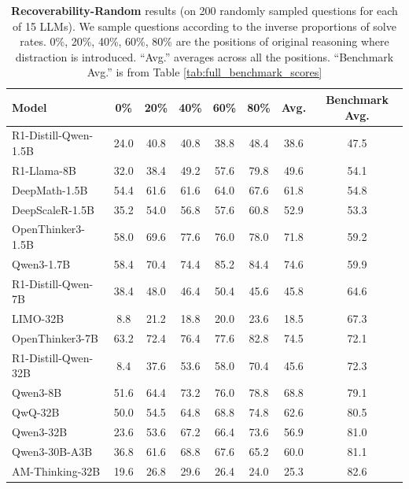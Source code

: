 \documentclass{article} %
\begin{document}
\begin{table}[ht!]
  \centering
  \begin{tabular}{lcccccc|c}
    \toprule
    \textbf{Model} & \textbf{0\%} & \textbf{20\%} & \textbf{40\%} & \textbf{60\%} & \textbf{80\%} & \textbf{Avg.} & \textbf{Benchmark Avg.} \\
    \midrule
    R1-Distill-Qwen-1.5B    & 24.0 & 40.8 & 40.8 & 38.8 & 48.4 & 38.6 & 47.5 \\
    R1-Llama-8B             & 32.0 & 38.4 & 49.2 & 57.6 & 79.8 & 49.6 & 54.1 \\
    DeepMath-1.5B           & 54.4 & 61.6 & 61.6 & 64.0 & 67.6 & 61.8 & 54.8 \\
    DeepScaleR-1.5B         & 35.2 & 54.0 & 56.8 & 57.6 & 60.8 & 52.9 & 53.3 \\
    OpenThinker3-1.5B       & 58.0 & 69.6 & 77.6 & 76.0 & 78.0 & 71.8 & 59.2 \\
    Qwen3-1.7B              & 58.4 & 70.4 & 74.4 & 85.2 & 84.4 & 74.6 & 59.9 \\
    \midrule
    R1-Distill-Qwen-7B      & 38.4 & 48.0 & 46.4 & 50.4 & 45.6 & 45.8 & 64.6 \\
    LIMO-32B                & 8.8 & 21.2 & 18.8 & 20.0 & 23.6 & 18.5 & 67.3 \\
    OpenThinker3-7B         & 63.2 & 72.4 & 76.4 & 77.6 & 82.8 & 74.5 & 72.1 \\
    R1-Distill-Qwen-32B     & 8.4 & 37.6 & 53.6 & 58.0 & 70.4 & 45.6 & 72.3 \\
    \midrule
    Qwen3-8B                & 51.6 &  64.4 & 73.2 & 76.0 & 78.8 & 68.8 & 79.1 \\
    QwQ-32B                 & 50.0 & 54.5 & 64.8 & 68.8 & 74.8 & 62.6 & 80.5 \\
    Qwen3-32B               & 23.6 & 53.6 & 67.2 & 66.4 & 73.6 & 56.9 & 81.0 \\
    Qwen3-30B-A3B           & 36.8 & 61.6 & 68.8 & 67.6 & 65.2 & 60.0 & 81.1 \\
    AM-Thinking-32B      & 19.6 & 26.8 & 29.6 & 26.4 & 24.0 & 25.3 & 82.6 \\
    \bottomrule
  \end{tabular}
\caption{\textbf{Recoverability-Random} results (on 200 randomly sampled questions for each of 15 LLMs). We sample questions according to the inverse proportions of solve rates. 0\%, 20\%, 40\%, 60\%, 80\% are the positions of original reasoning where distraction is introduced. ``Avg.'' averages across all the positions. ``Benchmark Avg.'' is from Table \ref{tab:full_benchmark_scores}}
  \label{tab:recoverability_individual}
\end{table}
\end{document}
